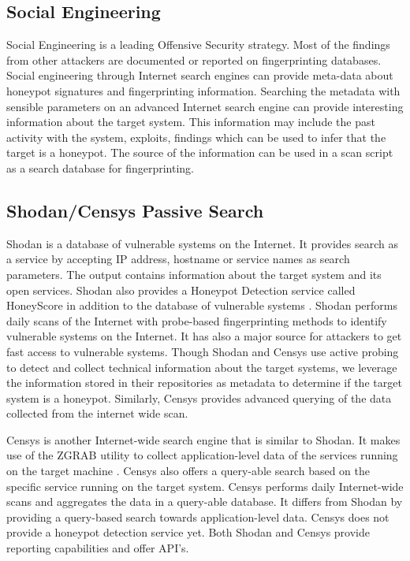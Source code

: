 \subsection{Social Engineering}
Social Engineering is a leading Offensive Security strategy. Most of the findings from other attackers are documented or reported on fingerprinting databases. Social engineering through Internet search engines can provide meta-data about honeypot signatures and fingerprinting information. Searching the metadata with sensible parameters on an advanced Internet search engine can provide interesting information about the target system. This information may include the past activity with the system, exploits, findings which can be used to infer that the target is a honeypot. The source of the information can be used in a scan script as a search database for fingerprinting. 

\subsection{Shodan/Censys Passive Search}
Shodan is a database of vulnerable systems on the Internet. It provides search as a service by accepting IP address, hostname or service names as search parameters. The output contains information about the target system and its open services. Shodan also provides a Honeypot Detection service called HoneyScore  in addition to the database of vulnerable systems \cite{SHODAN}. Shodan performs daily scans of the Internet with probe-based fingerprinting methods to identify vulnerable systems on the Internet. It has also a major source for attackers to get fast access to vulnerable systems. Though Shodan and Censys use active probing to detect and collect technical information about the target systems, we leverage the information stored in their repositories as metadata to determine if the target system is a honeypot. Similarly, Censys provides advanced querying of the data collected from the internet wide scan. 

Censys is another Internet-wide search engine that is similar to Shodan. It makes use of the ZGRAB  utility to collect application-level data of the services running on the target machine \cite{censys}. Censys also offers a query-able search based on the specific service running on the target system. Censys performs daily Internet-wide scans and aggregates the data in a query-able database. It differs from Shodan by providing a query-based search towards application-level data. Censys does not provide a honeypot detection service yet. Both Shodan and Censys provide reporting capabilities and offer API's. 


